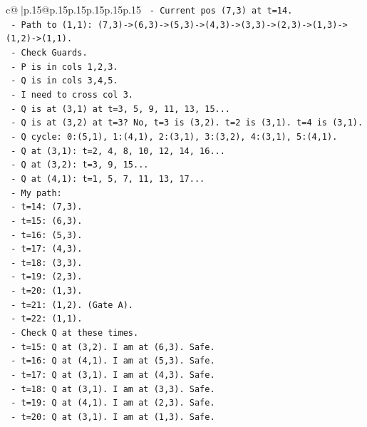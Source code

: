 \documentclass{article}
\begin{document}
{\begin{supertabular}{c@{$\;$}|p{.15\linewidth}@{}p{.15\linewidth}p{.15\linewidth}p{.15\linewidth}p{.15\linewidth}p{.15\linewidth}}
{{{\texttt{    {-} Current pos (7,3) at t=14.} \\
\texttt{    {-} Path to (1,1): (7,3){-}>(6,3){-}>(5,3){-}>(4,3){-}>(3,3){-}>(2,3){-}>(1,3){-}>(1,2){-}>(1,1).} \\
\texttt{    {-} Check Guards.} \\
\texttt{    {-} P is in cols 1,2,3.} \\
\texttt{    {-} Q is in cols 3,4,5.} \\
\texttt{    {-} I need to cross col 3.} \\
\texttt{    {-} Q is at (3,1) at t=3, 5, 9, 11, 13, 15...} \\
\texttt{    {-} Q is at (3,2) at t=3? No, t=3 is (3,2). t=2 is (3,1). t=4 is (3,1).} \\
\texttt{    {-} Q cycle: 0:(5,1), 1:(4,1), 2:(3,1), 3:(3,2), 4:(3,1), 5:(4,1).} \\
\texttt{    {-} Q at (3,1): t=2, 4, 8, 10, 12, 14, 16...} \\
\texttt{    {-} Q at (3,2): t=3, 9, 15...} \\
\texttt{    {-} Q at (4,1): t=1, 5, 7, 11, 13, 17...} \\
\texttt{    {-} My path:} \\
\texttt{      {-} t=14: (7,3).} \\
\texttt{      {-} t=15: (6,3).} \\
\texttt{      {-} t=16: (5,3).} \\
\texttt{      {-} t=17: (4,3).} \\
\texttt{      {-} t=18: (3,3).} \\
\texttt{      {-} t=19: (2,3).} \\
\texttt{      {-} t=20: (1,3).} \\
\texttt{      {-} t=21: (1,2). (Gate A).} \\
\texttt{      {-} t=22: (1,1).} \\
\texttt{    {-} Check Q at these times.} \\
\texttt{    {-} t=15: Q at (3,2). I am at (6,3). Safe.} \\
\texttt{    {-} t=16: Q at (4,1). I am at (5,3). Safe.} \\
\texttt{    {-} t=17: Q at (3,1). I am at (4,3). Safe.} \\
\texttt{    {-} t=18: Q at (3,1). I am at (3,3). Safe.} \\
\texttt{    {-} t=19: Q at (4,1). I am at (2,3). Safe.} \\
\texttt{    {-} t=20: Q at (3,1). I am at (1,3). Safe.} \\
}}}
\end{supertabular}}
\end{document}
